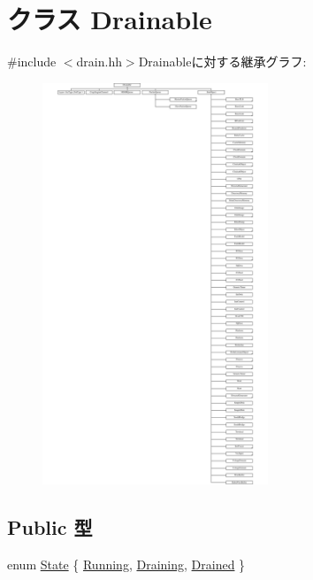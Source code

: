 \hypertarget{classDrainable}{
\section{クラス Drainable}
\label{classDrainable}
}


{\ttfamily \#include $<$drain.hh$>$}Drainableに対する継承グラフ:\begin{figure}[H]
\begin{center}
\leavevmode
\includegraphics[height=12cm]{classDrainable}
\end{center}
\end{figure}
\subsection*{Public 型}
\begin{DoxyCompactItemize}
\item 
enum \hyperlink{classDrainable_a5d74787dedbc4e11c1ab15bf487e61f8}{State} \{ \hyperlink{classDrainable_a5d74787dedbc4e11c1ab15bf487e61f8a2f5f2c4a8c4f4f0519d503dcdfbf55cb}{Running}, 
\hyperlink{classDrainable_a5d74787dedbc4e11c1ab15bf487e61f8a929d17847bfad0d4689c9ab8540d5134}{Draining}, 
\hyperlink{classDrainable_a5d74787dedbc4e11c1ab15bf487e61f8a5656955cb808502a2ec75b367e2c1e82}{Drained}
 \}
\end{DoxyCompactItemize}

